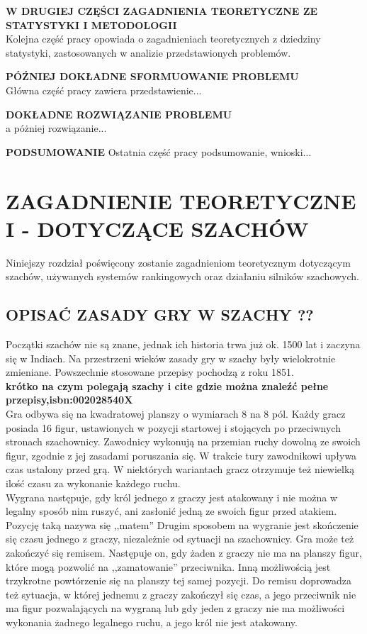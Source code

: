 \documentclass[inzynierska]{pwr_wmat_praca_dyplomowa}
\theoremstyle{plain}
\numberwithin{theorem}{chapter}
\theoremstyle{definition}
\numberwithin{theorem}{chapter}
\begin{document}
\textbf{W DRUGIEJ CZĘŚCI ZAGADNIENIA TEORETYCZNE ZE STATYSTYKI I METODOLOGII}\\
Kolejna część pracy opowiada o zagadnieniach teoretycznych z dziedziny statystyki, zastosowanych w analizie przedstawionych problemów.
 
 
\textbf{PÓŹNIEJ DOKŁADNE SFORMUOWANIE PROBLEMU}\\
Główna część pracy zawiera przedstawienie...

\textbf{DOKŁADNE ROZWIĄZANIE PROBLEMU}\\
a póżniej rozwiązanie...

\textbf{PODSUMOWANIE}
Ostatnia część pracy podsumowanie, wnioski...

\chapter{ZAGADNIENIE TEORETYCZNE I - DOTYCZĄCE SZACHÓW}
Niniejszy rozdział poświęcony zostanie zagadnieniom teoretycznym dotyczącym szachów, używanych systemów rankingowych oraz działaniu silników szachowych.
\section{OPISAĆ ZASADY GRY W SZACHY ??}
Początki szachów nie są znane, jednak ich historia trwa już ok. 1500 lat i zaczyna się w Indiach. Na przestrzeni wieków zasady gry w szachy były wielokrotnie zmieniane. Powszechnie stosowane przepisy pochodzą z roku 1851.\\

\textbf{krótko na czym polegają szachy i cite gdzie można znaleźć pełne przepisy,isbn:002028540X}\\

Gra odbywa się na kwadratowej planszy o wymiarach 8 na 8 pól. Każdy gracz posiada 16 figur, ustawionych w pozycji startowej i stojących po przeciwnych stronach szachownicy. Zawodnicy wykonują na przemian ruchy dowolną ze swoich figur, zgodnie z jej zasadami poruszania się. W trakcie tury zawodnikowi upływa czas ustalony przed grą. W niektórych wariantach gracz otrzymuje też niewielką ilość czasu za wykonanie każdego ruchu.\\

Wygrana następuje, gdy król jednego z graczy jest atakowany i nie można w legalny sposób nim ruszyć, ani zasłonić jedną ze swoich figur przed atakiem. Pozycję taką nazywa się ,,matem'' Drugim sposobem na wygranie jest skończenie się czasu jednego z graczy, niezależnie od sytuacji na szachownicy. 
Gra może też zakończyć się remisem. Następuje on, gdy żaden z graczy nie ma na planszy figur, które mogą pozwolić na ,,zamatowanie'' przeciwnika. Inną możliwością jest trzykrotne powtórzenie się na planszy tej samej pozycji. Do remisu doprowadza też sytuacja, w której jednemu z graczy zakończył się czas, a jego przeciwnik nie ma figur pozwalających na wygraną lub gdy jeden z graczy nie ma możliwości wykonania żadnego legalnego ruchu, a jego król nie jest atakowany.
\end{document}
